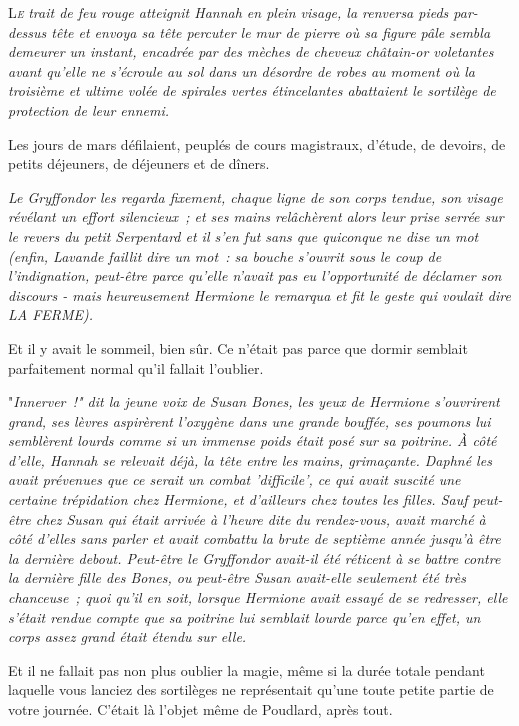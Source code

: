 
\lettrine{L}{\emph{e}} \emph{trait de feu rouge atteignit Hannah en plein visage, la renversa pieds par-dessus tête et envoya sa tête percuter le mur de pierre où sa figure pâle sembla demeurer un instant, encadrée par des mèches de cheveux châtain-or voletantes avant qu'elle ne s'écroule au sol dans un désordre de robes au moment où la troisième et ultime volée de spirales vertes étincelantes abattaient le sortilège de protection de leur ennemi.}

Les jours de mars défilaient, peuplés de cours magistraux, d'étude, de devoirs, de petits déjeuners, de déjeuners et de dîners.

\emph{Le Gryffondor les regarda fixement, chaque ligne de son corps tendue, son visage révélant un effort silencieux~; et ses mains relâchèrent alors leur prise serrée sur le revers du petit Serpentard et il s'en fut sans que quiconque ne dise un mot (enfin, Lavande faillit dire un mot~: sa bouche s'ouvrit sous le coup de l'indignation, peut-être parce qu'elle n'avait pas eu l'opportunité de déclamer son discours - mais heureusement Hermione le remarqua et fit le geste qui voulait dire LA FERME).}

Et il y avait le sommeil, bien sûr. Ce n'était pas parce que dormir semblait parfaitement normal qu'il fallait l'oublier.

"\emph{Innerver~!" dit la jeune voix de Susan Bones, les yeux de Hermione s'ouvrirent grand, ses lèvres aspirèrent l'oxygène dans une grande bouffée, ses poumons lui semblèrent lourds comme si un immense poids était posé sur sa poitrine. À côté d'elle, Hannah se relevait déjà, la tête entre les mains, grimaçante. Daphné les avait prévenues que ce serait un combat 'difficile', ce qui avait suscité une certaine trépidation chez Hermione, et d'ailleurs chez toutes les filles. Sauf peut-être chez Susan qui était arrivée à l'heure dite du rendez-vous, avait marché à côté d'elles sans parler et avait combattu la brute de septième année jusqu'à être la dernière debout. Peut-être le Gryffondor avait-il été réticent à se battre contre la dernière fille des Bones, ou peut-être Susan avait-elle seulement été très chanceuse~; quoi qu'il en soit, lorsque Hermione avait essayé de se redresser, elle s'était rendue compte que sa poitrine lui semblait lourde parce qu'en effet, un corps assez grand était étendu sur elle.}

Et il ne fallait pas non plus oublier la magie, même si la durée totale pendant laquelle vous lanciez des sortilèges ne représentait qu'une toute petite partie de votre journée. C'était là l'objet même de Poudlard, après tout.

